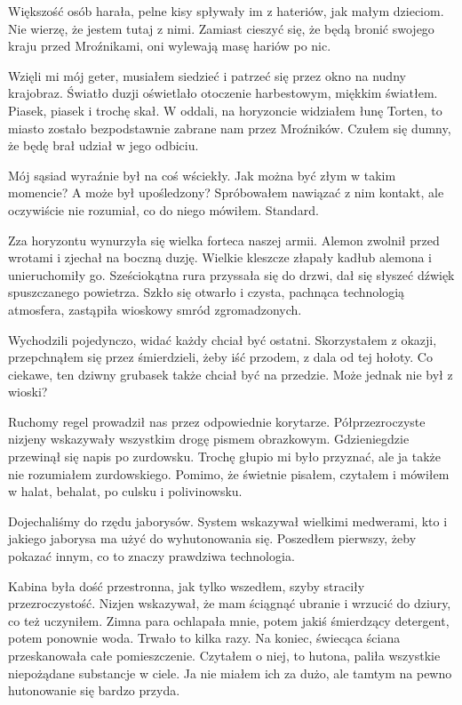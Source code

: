 Większość osób harała, pelne kisy spływały im z hateriów, jak małym dzieciom.
Nie wierzę, że jestem tutaj z nimi. Zamiast cieszyć się, że będą bronić swojego kraju przed Mroźnikami, oni wylewają masę hariów po nic.

Wzięli mi mój geter, musiałem siedzieć i patrzeć się przez okno na nudny krajobraz.
Światło duzji oświetlało otoczenie harbestowym, miękkim światłem.
Piasek, piasek i trochę skał.
W oddali, na horyzoncie widziałem łunę Torten, to miasto zostało bezpodstawnie zabrane nam przez Mroźników.
Czułem się dumny, że będę brał udział w jego odbiciu.

Mój sąsiad wyraźnie był na coś wściekły. 
Jak można być złym w takim momencie?
A może był upośledzony?
Spróbowałem nawiązać z nim kontakt, ale oczywiście nie rozumiał, co do niego mówiłem.
Standard.

Zza horyzontu wynurzyła się wielka forteca naszej armii.
Alemon zwolnił przed wrotami i zjechał na boczną duzję. 
Wielkie kleszcze złapały kadłub alemona i unieruchomiły go.
Sześciokątna rura przyssała się do drzwi, dał się słyszeć dźwięk spuszczanego powietrza.
Szkło się otwarło i czysta, pachnąca technologią atmosfera, zastąpiła wioskowy smród zgromadzonych.

Wychodzili pojedynczo, widać każdy chciał być ostatni.
Skorzystałem z okazji, przepchnąłem się przez śmierdzieli, żeby iść przodem, z dala od tej hołoty.
Co ciekawe, ten dziwny grubasek także chciał być na przedzie. Może jednak nie był z wioski?

Ruchomy regel prowadził nas przez odpowiednie korytarze.
Półprzezroczyste nizjeny wskazywały wszystkim drogę pismem obrazkowym.
Gdzieniegdzie przewinął się napis po zurdowsku.
Trochę głupio mi było przyznać, ale ja także nie rozumiałem zurdowskiego. 
Pomimo, że świetnie pisałem, czytałem i mówiłem w halat, behalat, po culsku i polivinowsku.

Dojechaliśmy do rzędu jaborysów. System wskazywał wielkimi medwerami, kto i jakiego jaborysa ma użyć do wyhutonowania się.
Poszedłem pierwszy, żeby pokazać innym, co to znaczy prawdziwa technologia.

Kabina była dość przestronna, jak tylko wszedłem, szyby straciły przezroczystość.
Nizjen wskazywał, że mam ściągnąć ubranie i wrzucić do dziury, co też uczyniłem.
Zimna para ochlapała mnie, potem jakiś śmierdzący detergent, potem ponownie woda.
Trwało to kilka razy.
Na koniec, świecąca ściana przeskanowała całe pomieszczenie.
Czytałem o niej, to hutona, paliła wszystkie niepożądane substancje w ciele.
Ja nie miałem ich za dużo, ale tamtym na pewno hutonowanie się bardzo przyda.


